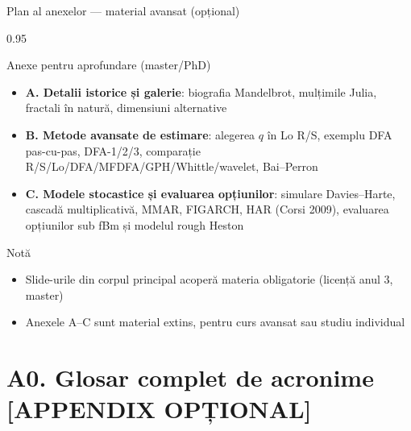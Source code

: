 \documentclass[9pt, aspectratio=169, t]{beamer}
\begin{document}
\appendix

\begin{frame}[shrink=15]{Plan al anexelor --- material avansat (opțional)}
\begin{cminipage}{0.95\textwidth}
\begin{block}{Anexe pentru aprofundare (master/PhD)}
\begin{itemize}\setlength{\itemsep}{1pt}
    \item \textbf{A. Detalii istorice și galerie}: biografia Mandelbrot, mulțimile Julia, fractali în natură, dimensiuni alternative
    \item \textbf{B. Metode avansate de estimare}: alegerea $q$ în Lo R/S, exemplu DFA pas-cu-pas, DFA-1/2/3, comparație R/S/Lo/DFA/MFDFA/GPH/Whittle/wavelet, Bai--Perron
    \item \textbf{C. Modele stocastice și evaluarea opțiunilor}: simulare Davies--Harte, cascadă multiplicativă, MMAR, FIGARCH, HAR (Corsi 2009), evaluarea opțiunilor sub fBm și modelul rough Heston
\end{itemize}
\end{block}
\begin{exampleblock}{Notă}
\begin{itemize}\setlength{\itemsep}{0pt}
    \item Slide-urile din corpul principal acoperă materia obligatorie (licență anul 3, master)
    \item Anexele A--C sunt material extins, pentru curs avansat sau studiu individual
\end{itemize}
\end{exampleblock}
\end{cminipage}
\end{frame}

\section*{A0. Glosar complet de acronime [APPENDIX OPȚIONAL]}
\end{document}
